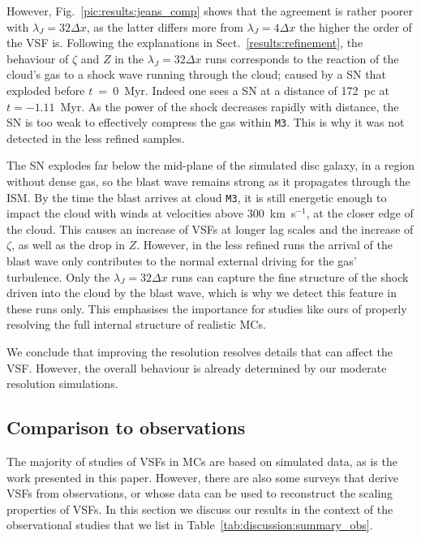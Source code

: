 \documentclass{aa}		%
\begin{document}
However, Fig.~\ref{pic:results:jeans_comp} shows that the agreement is rather poorer with $\lambda_J=32\Delta{}x$, as the latter differs more from $\lambda_J=4\Delta{}x$ the higher the order of the VSF is.
Following the explanations in Sect.~\ref{results:refinement}, the behaviour of $\zeta$ and $Z$ in the $\lambda_J=32\Delta{}x$ runs corresponds to the reaction of the cloud's gas to a shock wave running through the cloud; caused by a SN that exploded before $t$~=~0~Myr. 
Indeed one sees a SN at a distance of 172~pc at $t=-1.11$~Myr. 
As the power of the shock decreases rapidly with distance, the SN is too weak to effectively compress the gas within \texttt{M3}.
This is why it was not detected in the less refined samples.

The SN explodes far below the mid-plane of the simulated disc galaxy, in a region without dense gas, so the blast wave remains strong as it propagates through the ISM. 
By the time the blast arrives at cloud \texttt{M3}, it is still energetic enough to impact the cloud with winds at velocities above 300~km~s$^{-1}$, at the closer edge of the cloud. 
This causes an increase of VSFs at longer lag scales and the increase of $\zeta$, as well as the drop in $Z$.
However, in the less refined runs the arrival of the blast wave only contributes to the normal external driving for the gas' turbulence.
Only the $\lambda_J=32\Delta{}x$ runs can capture the fine structure of the shock driven into the cloud by the blast wave, which is why we detect this feature in these runs only. 
This emphasises the importance for studies like ours of properly resolving the full internal structure of realistic MCs.

We conclude that improving the resolution resolves details that can affect the VSF.
However, the overall behaviour is already determined by our moderate resolution simulations.

\subsection{Comparison to observations}\label{discussion:observation}

The majority of studies of VSFs in MCs are based on simulated data, as is the work presented in this paper.
However, there are also some surveys that derive VSFs from observations, or whose data can be used to reconstruct the scaling properties of VSFs. 
In this section we discuss our results in the context of the observational studies that we list in Table~\ref{tab:discussion:summary_obs}.
\end{document}
